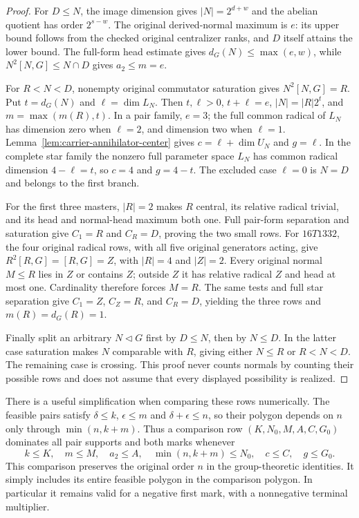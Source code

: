 \begin{proof}
For $D\leq N$, the image dimension gives $|N|=2^{d+w}$ and the
abelian quotient has order $2^{s-w}$. The original derived-normal
maximum is $e$: its upper bound follows from the checked original
centralizer ranks, and $D$ itself attains the lower bound. The full-form
head estimate gives $d_G(N)\leq\max(e,w)$, while
$N^2[N,G]\leq N\cap D$ gives $a_2\leq m=e$.

For $R<N<D$, nonempty original commutator saturation gives
$N^2[N,G]=R$. Put $t=d_G(N)$ and $\ell=\dim L_N$.
Then $t,\ell>0$, $t+\ell=e$, $|N|=|R|2^t$, and
$m=\max(m(R),t)$. In a pair family, $e=3$; the full common radical
of $L_N$ has dimension zero when $\ell=2$, and dimension two when
$\ell=1$. Lemma~\ref{lem:carrier-annihilator-center} gives
$c=\ell+\dim U_N$ and $g=\ell$.
In the complete star family the nonzero full parameter space $L_N$
has common radical dimension $4-\ell=t$, so $c=4$ and $g=4-t$.
The excluded case $\ell=0$ is $N=D$ and belongs to the first branch.

For the first three masters, $|R|=2$ makes $R$ central, its relative
radical trivial, and its head and normal-head maximum both one.
Full pair-form separation and saturation give $C_1=R$ and $C_R=D$,
proving the two small rows. For $16T1332$, the four original radical
rows, with all five original generators acting, give
$R^2[R,G]=[R,G]=Z$, with $|R|=4$ and $|Z|=2$.
Every original normal $M\leq R$ lies in $Z$ or contains $Z$;
outside $Z$ it has relative radical $Z$ and head at most one.
Cardinality therefore forces $M=R$. The same tests and full star
separation give $C_1=Z$, $C_Z=R$, and $C_R=D$, yielding the three
rows and $m(R)=d_G(R)=1$.

Finally split an arbitrary $N\lhd G$ first by $D\leq N$, then by
$N\leq D$. In the latter case saturation makes $N$ comparable with
$R$, giving either $N\leq R$ or $R<N<D$. The remaining case is
crossing. This proof never counts normals by counting their possible
rows and does not assume that every displayed possibility is realized.
\end{proof}

There is a useful simplification when comparing these rows numerically.
The feasible pairs satisfy $\delta\leq k$, $\epsilon\leq m$ and
$\delta+\epsilon\leq n$, so their polygon depends on $n$ only through
$\min(n,k+m)$. Thus a comparison row $(K,N_0,M,A,C,G_0)$ dominates
all pair supports and both marks whenever
\[
 k\leq K,\quad m\leq M,\quad a_2\leq A,\quad
 \min(n,k+m)\leq N_0,\quad c\leq C,\quad g\leq G_0.
\]
This comparison preserves the original order $n$ in the group-theoretic
identities. It simply includes its entire feasible polygon in the
comparison polygon. In particular it remains valid for a negative
first mark, with a nonnegative terminal multiplier.

